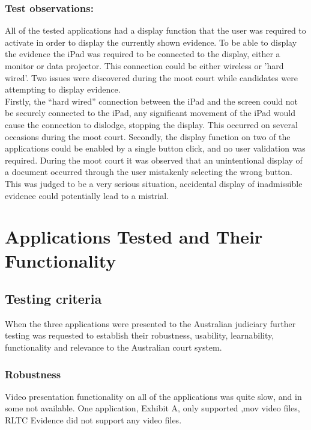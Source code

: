 \documentclass{article}
\begin{document}
\subsubsection{Test observations:}
All of the tested applications had a display function that the user was required to activate in order to display the currently shown evidence. To be able to display the evidence the iPad was required to be connected to the display, either a monitor or data projector. This connection could be either wireless or 'hard wired'. Two issues were discovered during the moot court while candidates were attempting to display evidence. \\
Firstly, the ``hard wired'' connection between the iPad and the screen could not be securely connected to the iPad, any significant movement of the iPad would cause the connection to dislodge, stopping the display. This occurred on several occasions during the moot court.
Secondly, the display function on two of the applications could be enabled by a single button click, and no user validation was required. During the moot court it was observed that an unintentional display of a document occurred through the user mistakenly selecting the wrong button. This was judged to be a very serious situation, accidental display of inadmissible evidence could potentially lead to a mistrial.

\section{Applications Tested and Their Functionality}
\subsection{Testing criteria}
When the three applications were presented to the Australian judiciary further testing was requested to establish their robustness, usability, learnability, functionality and relevance to the Australian court system.
\subsubsection{Robustness}
Video presentation functionality on all of the applications was quite slow, and in some not available. One application, Exhibit A, only supported ,mov video files, RLTC Evidence did not support any video files.
\end{document}
